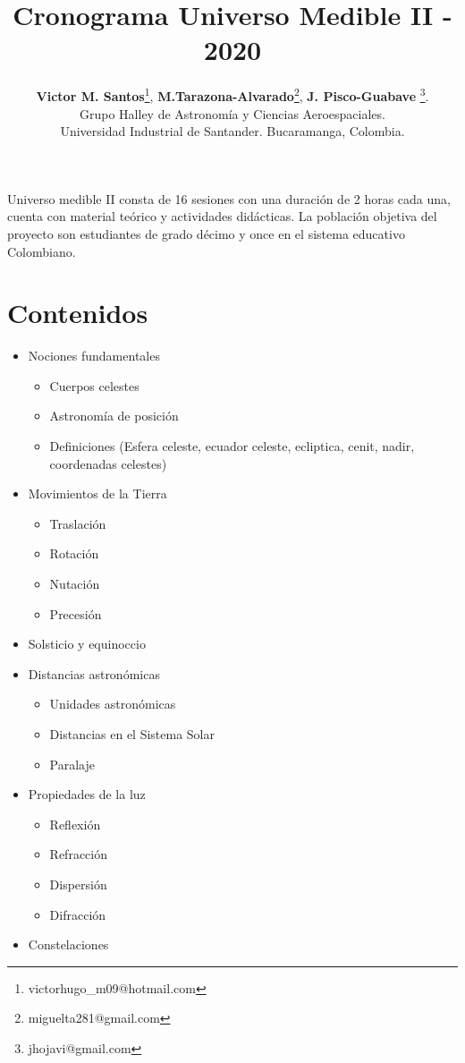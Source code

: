\documentclass[10pt,a4paper]{article}
\title{Cronograma Universo Medible II - 2020}
\author{\textbf{Victor M. Santos}\thanks{victorhugo\_m09@hotmail.com}, \textbf{M.Tarazona-Alvarado}\thanks{miguelta281@gmail.com}, \textbf{J. Pisco-Guabave} \thanks{jhojavi@gmail.com}. \\ Grupo Halley de Astronomía y Ciencias Aeroespaciales. \\ Universidad Industrial de Santander. Bucaramanga, Colombia.}
\date{ }
\begin{document}
\maketitle

Universo medible II consta de 16 sesiones con una duración de 2 horas cada una, cuenta con material teórico y actividades didácticas. La población objetiva del proyecto son estudiantes de grado décimo y once en el sistema educativo Colombiano. 

\tableofcontents
\section{Contenidos}
\begin{itemize}
\item Nociones fundamentales
 \begin{itemize}
  \item Cuerpos celestes 
  \item Astronomía de posición
  \item Definiciones (Esfera celeste, ecuador celeste, ecliptica, cenit, nadir, coordenadas celestes)
 \end{itemize}
\item Movimientos de la Tierra
 \begin{itemize}
  \item Traslación 
  \item Rotación
  \item Nutación
  \item Precesión 
 \end{itemize}
\item Solsticio y equinoccio
\item Distancias astronómicas 
 \begin{itemize}
 \item Unidades astronómicas
 \item Distancias en el Sistema Solar
 \item Paralaje
 \end{itemize} 
\item Propiedades de la luz
 \begin{itemize}
 \item Reflexión
 \item Refracción
 \item Dispersión 
 \item Difracción 
 \end{itemize}
\item Constelaciones 
 \begin{itemize}

\end{itemize}
\end{itemize}
\end{document}
